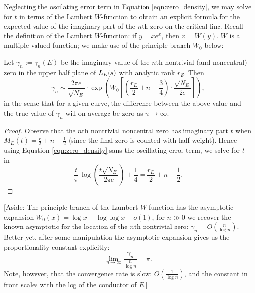 Neglecting the oscilating error term in Equation \ref{eqn:zero_density}, we may solve for $t$ in terms of the Lambert $W$-function to obtain an explicit formula for the expected value of the imaginary part of the $n$th zero on the critical line. Recall the definition of the Lambert $W$-function: if $y = x e^x$, then $x = W(y)$. $W$ is a multiple-valued function; we make use of the principle branch $W_0$ below:
\begin{corollary}[GRH]\label{cor:gamma_n_approx_value}
Let $\gamma_n := \gamma_n(E)$ be the imaginary value of the $n$th nontrivial (and noncentral) zero in the upper half plane of $L_E(s)$ with analytic rank $r_E$. Then
\begin{equation}\label{approx:gamma_n}
\gamma_n \sim \frac{2\pi e}{\sqrt{N_E}} \cdot \exp \left(W_0\left[\left(\frac{r_E}{2} +n - \frac{3}{4}\right)\cdot \frac{\sqrt{N_E}}{2 e}\right]\right),
\end{equation}
in the sense that for a given curve, the difference between the above value and the true value of $\gamma_n$ will on average be zero as $n \to \infty$.
\end{corollary}
\begin{proof}
Observe that the $n$th nontrivial noncentral zero has imaginary part $t$ when $M_E(t) = \frac{r}{2} + n - \frac{1}{2}$ (since the final zero is counted with half weight). Hence using Equation \ref{eqn:zero_density} sans the oscillating error term, we solve for $t$ in
\begin{equation*}
\frac{t}{\pi} \, \log\left(\frac{t\sqrt{N_E}}{2\pi e}\right) + \frac{1}{4} = \frac{r_E}{2} + n - \frac{1}{2}.
\end{equation*}
\end{proof}

[Aside: The principle branch of the Lambert $W$-function has the asymptotic expansion $W_0(x) = \log x - \log \log x + o\left(1\right)$, for $n \gg 0$ we recover the known asymptotic for the location of the $n$th nontrivial zero: $\gamma_n = O\left(\frac{n}{\log n} \right)$. Better yet, after some manipulation the asymptotic expansion gives us the proportionality constant explicitly:
\begin{equation}
\lim_{n \to \infty} \frac{\gamma_n}{\frac{n}{\log n}} = \pi.
\end{equation}
Note, however, that the convergence rate is slow: $O(\frac{1}{\log n})$, and the constant in front scales with the log of the conductor of $E$.] \\

